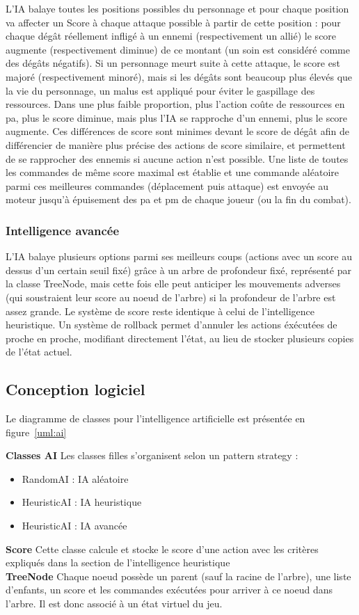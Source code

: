 \documentclass[a4paper,12pt]{article}
\begin{document}
L'IA balaye toutes les positions possibles du personnage et pour chaque position va affecter un Score à chaque attaque possible à partir de cette position : pour chaque dégât réellement infligé à un ennemi (respectivement un allié) le score augmente (respectivement diminue) de ce montant (un soin est considéré comme des dégâts négatifs). Si un personnage meurt suite à cette attaque, le score est majoré (respectivement minoré), mais si les dégâts sont beaucoup plus élevés que la vie du personnage, un malus est appliqué pour éviter le gaspillage des ressources. Dans une plus faible proportion, plus l'action coûte de ressources en pa, plus le score diminue, mais plus l'IA se rapproche d'un ennemi, plus le score augmente. Ces différences de score sont minimes devant le score de dégât afin de différencier de manière plus précise des actions de score similaire, et permettent de se rapprocher des ennemis si aucune action n'est possible.
Une liste de toutes les commandes de même score maximal est établie et une commande aléatoire parmi ces meilleures commandes (déplacement puis attaque) est envoyée au moteur jusqu'à épuisement des pa et pm de chaque joueur (ou la fin du combat).

\subsubsection{Intelligence avancée}

L'IA balaye plusieurs options parmi ses meilleurs coups (actions avec un score au dessus d'un certain seuil fixé) grâce à un arbre de profondeur fixé, représenté par la classe TreeNode, mais cette fois elle peut anticiper les mouvements adverses (qui soustraient leur score au noeud de l'arbre) si la profondeur de l'arbre est assez grande. Le système de score reste identique à celui de l'intelligence heuristique. Un système de rollback permet d'annuler les actions éxécutées de proche en proche, modifiant directement l'état, au lieu de stocker plusieurs copies de l'état actuel.

\clearpage
\subsection{Conception logiciel}
Le diagramme de classes pour l'intelligence artificielle est présentée en figure~\ref{uml:ai}

\textbf{Classes AI} Les classes filles s'organisent selon un pattern strategy : 
\begin{itemize}
\item RandomAI : IA aléatoire
\item HeuristicAI : IA heuristique
\item HeuristicAI : IA avancée
\end{itemize}
\textbf{Score} Cette classe calcule et stocke le score d'une action avec les critères expliqués dans la section de l'intelligence heuristique
\\\textbf{TreeNode} Chaque noeud possède un parent (sauf la racine de l'arbre), une liste d'enfants, un score et les commandes exécutées pour arriver à ce noeud dans l'arbre. Il est donc associé à un état virtuel du jeu.
\end{document}
